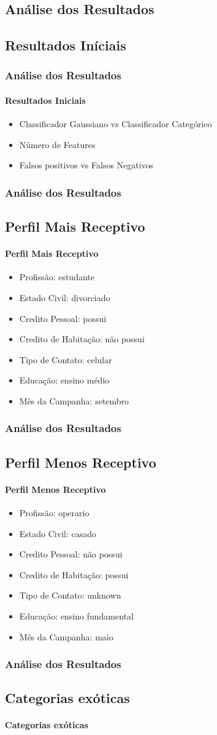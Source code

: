 \documentclass{beamer}
\begin{document}
\begin{frame}
\section{Análise dos Resultados}
\subsection{Resultados Iníciais}
\frametitle{Análise dos Resultados}
\framesubtitle{Resultados Iniciais}  
\begin{itemize}
\item Classificador Gaussiano vs Classificador Categórico
\item Número de Features
\item Falsos positivos vs Falsos Negativos
\end{itemize}
\end{frame}

\begin{frame}
    \frametitle{Análise dos Resultados}  
    \subsection{Perfil Mais Receptivo}
    \framesubtitle{Perfil Mais Receptivo}
    \begin{itemize}
    \item Profissão: estudante
    \item Estado Civil: divorciado
    \item Credito Pessoal: possui
    \item Credito de Habitação: não possui
    \item Tipo de Contato: celular
    \item Educação: ensino médio
    \item Mês da Campanha: setembro
    \end{itemize}
\end{frame}

\begin{frame}
    \frametitle{Análise dos Resultados}  
    \subsection{Perfil Menos Receptivo}
    \framesubtitle{Perfil Menos Receptivo}
    \begin{itemize}
    \item Profissão: operario
    \item Estado Civil: casado
    \item Credito Pessoal: não possui
    \item Credito de Habitação: possui
    \item Tipo de Contato: unknown
    \item Educação: ensino fundamental
    \item Mês da Campanha: maio
    \end{itemize}
\end{frame}


\begin{frame}
	\frametitle{Análise dos Resultados}
    \subsection{Categorias exóticas}
	\framesubtitle{Categorias exóticas}
 
\end{frame}
\end{document}
